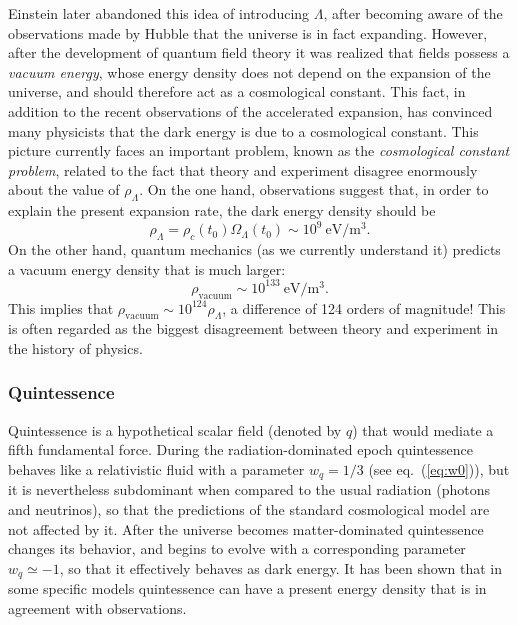 \documentclass[11pt, a4paper,oneside,openright]{book}
\numberwithin{equation}{section}
\begin{document}
Einstein later abandoned this idea of introducing $\Lambda$, after becoming aware of the observations made by Hubble that the universe is in fact expanding. However, after the development of quantum field theory it was realized that fields possess a {\it vacuum energy}, whose energy density does not depend on the expansion of the universe, and should therefore act as a cosmological constant. This fact, in addition to the recent observations of the accelerated expansion, has convinced many physicists that the dark energy is due to a cosmological constant. This picture currently faces an important problem, known as the {\it cosmological constant problem}, related to the fact that theory and experiment disagree enormously about the value of $\rho_{\Lambda}$. On the one hand, observations suggest that, in order to explain the present expansion rate, the dark energy density should be
\begin{equation}
\rho_{\Lambda}=\rho_c(t_0)\Omega_{\Lambda}(t_0)\sim 10^9~\mathrm{eV/m^3}.
\end{equation}
On the other hand, quantum mechanics (as we currently understand it) predicts a vacuum energy density that is much larger:
\begin{equation}
\rho_{\mathrm{vacuum}}\sim 10^{133}~\mathrm{eV/m^3}.
\end{equation}
This implies that $\rho_{\mathrm{vacuum}}\sim 10^{124}\rho_{\Lambda}$, a difference of 124 orders of magnitude! This is often regarded as the biggest disagreement between theory and experiment in the history of physics.

\subsubsection{Quintessence}

Quintessence is a hypothetical scalar field (denoted by $q$) that would mediate a fifth fundamental force. During the radiation-dominated epoch quintessence behaves like a relativistic fluid with a parameter $w_q=1/3$ (see eq.\ (\ref{eq:w0})), but it is nevertheless subdominant when compared to the usual radiation (photons and neutrinos), so that the predictions of the standard cosmological model are not affected by it. After the universe becomes matter-dominated quintessence changes its behavior, and begins to evolve with a corresponding parameter $w_q\simeq -1$, so that it effectively behaves as dark energy. It has been shown that in some specific models quintessence can have a present energy density that is in agreement with observations.
\end{document}
